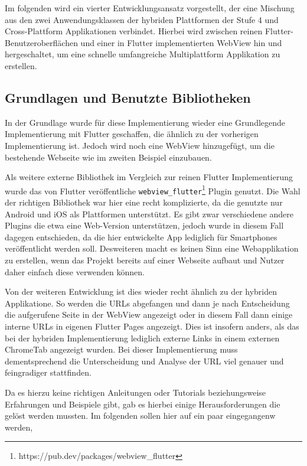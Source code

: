 Im folgenden wird ein vierter Entwicklungsansatz vorgestellt, der eine Mischung aus den zwei Anwendungsklassen der hybriden Plattformen der Stufe 4 und Cross-Plattform Applikationen verbindet. Hierbei wird zwischen reinen Flutter-Benutzeroberflächen und einer in Flutter implementierten WebView hin und hergeschaltet, um eine schnelle umfangreiche Multiplattform Applikation zu erstellen.

\subsection{Grundlagen und Benutzte Bibliotheken}
In der Grundlage wurde für diese Implementierung wieder eine Grundlegende Implementierung mit Flutter geschaffen, die ähnlich zu der vorherigen Implementierung ist. Jedoch wird noch eine WebView hinzugefügt, um die bestehende Webseite wie im zweiten Beispiel einzubauen.  

Als weitere externe Bibliothek im Vergleich zur reinen Flutter Implementierung wurde das von Flutter veröffentliche \verb|webview_flutter|\footnote{https://pub.dev/packages/webview\_flutter} Plugin genutzt. Die Wahl der richtigen Bibliothek war hier eine recht komplizierte, da die genutzte nur Android und iOS als Plattformen unterstützt. Es gibt zwar verschiedene andere Plugins die etwa eine Web-Version unterstützen, jedoch wurde in diesem Fall dagegen entschieden, da die hier entwickelte App lediglich für Smartphones veröffentlicht werden soll. Desweiteren macht es keinen Sinn eine Webapplikation zu erstellen, wenn das Projekt bereits auf einer Webseite aufbaut und Nutzer daher einfach diese verwenden können.

Von der weiteren Entwicklung ist dies wieder recht ähnlich zu der hybriden Applikatione. So werden die URLs abgefangen und dann je nach Entscheidung die aufgerufene Seite in der WebView angezeigt oder in diesem Fall dann einige interne URLs in eigenen Flutter Pages angezeigt. Dies ist insofern anders, als das bei der hybriden Implementierung lediglich externe Links in einem externen ChromeTab angezeigt wurden. Bei dieser Implementierung muss dementsprechend die Unterscheidung und Analyse der URL viel genauer und feingradiger stattfinden.


Da es hierzu keine richtigen Anleitungen oder Tutorials beziehungsweise Erfahrungen und Beispiele gibt, gab es hierbei einige Herausforderungen die gelöst werden mussten. Im folgenden sollen hier auf ein paar eingegangenw werden,

